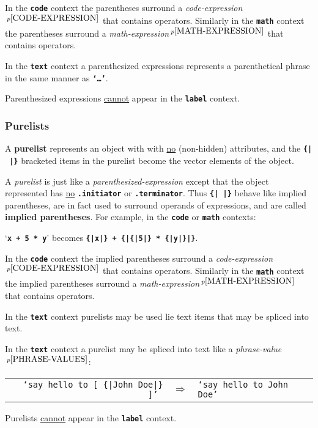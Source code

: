 \documentclass[12pt]{article}
\newcommand{\TT}[1]{{\tt \bfseries #1}}
\newcommand{\key}[1]{{\rm \bfseries #1}}
\newcommand{\pagnote}[1]{$\,^{p\pageref{#1}}$}
\newenvironment{indpar}[1][0.3in]%
	{\begin{list}{}%
		     {\setlength{\itemsep}{0in}%
		      \setlength{\topsep}{0in}%
		      \setlength{\parsep}{1ex}%
		      \setlength{\labelwidth}{#1}%
		      \setlength{\leftmargin}{#1}%
		      \addtolength{\leftmargin}{\labelsep}}%
	 \item}%
	{\end{list}}
\begin{document}
In the \TT{code} context the parentheses surround
a {\em code-expression}\pagnote{CODE-EXPRESSION} that contains operators.
Similarly in the \TT{math} context the parentheses surround
a {\em math-expression}\pagnote{MATH-EXPRESSION} that contains operators.

In the \TT{text} context a parenthesized expressions represents a parenthetical
phrase in the same manner as \TT{`\dots'}.

Parenthesized expressions \underline{cannot} appear in the
\TT{label} context.

\subsubsection{Purelists}
\label{PURELISTS}

A \key{purelist} represents an object with with
\underline{no} (non-hidden) attributes, and the
\TT{\{|~|\}} bracketed items in the purelist
become the vector elements of the object.

A {\em purelist} is just like a {\em parenthesized-expression} except that
the object represented has \underline{no} \TT{.ini\-ti\-ator}
or \TT{.ter\-min\-ator}.
Thus \TT{\{|~|\}} behave like implied parentheses, are in fact used to
surround operands of expressions, and are called
\key{implied parentheses}.
For example, in the \TT{code} or \TT{math} contexts: \\
\centerline{`\TT{x + 5 * y}' becomes \TT{\{|x|\} + \{|\{|5|\} * \{|y|\}|\}}.}

In the \TT{code} context the implied parentheses surround
a {\em code-expression}\pagnote{CODE-EXPRESSION} that contains operators.
Similarly in the \TT{math} context the implied parentheses surround
a {\em math-expression}\pagnote{MATH-EXPRESSION} that contains operators.

In the \TT{text} context purelists may be used lie
text items that may be spliced into text.

In the \TT{text} context a purelist may be spliced into text like
a {\em phrase-value}\pagnote{PHRASE-VALUES}:
\begin{indpar}[1em]
\begin{tabular}{rcl}
\tt `say hello to \TT{[} \{|John Doe|\} \TT{]}' & $\Longrightarrow$
                                           & \tt `say hello to John Doe'
\end{tabular}
\end{indpar}

Purelists \underline{cannot} appear in the \TT{label} context.
\end{document}
